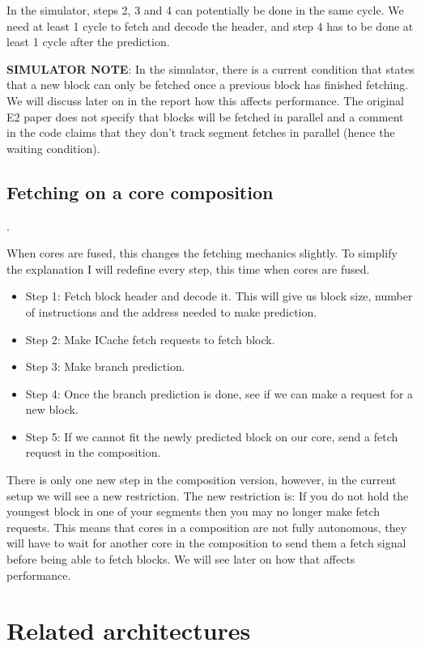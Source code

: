 In the simulator, steps 2, 3 and 4 can potentially be done in the same cycle. We need at least 1 cycle to fetch and decode the header, and step 4 has to be done at least 1 cycle after the prediction.

\textbf{SIMULATOR NOTE}: In the simulator, there is a current condition that states that a new block can only be fetched once a previous block has finished fetching. We will discuss later on in the report how this affects performance.
The original E2 paper does not specify that blocks will be fetched in parallel and a comment in the code claims that they don't track segment fetches in parallel (hence the waiting condition).

\subsection{Fetching on a core composition}.

When cores are fused, this changes the fetching mechanics slightly.
To simplify the explanation I will redefine every step, this time when cores are fused.


\begin{itemize}
\item Step 1: Fetch block header and decode it. This will give us block size, number of instructions and the address needed to make prediction.
\item Step 2: Make ICache fetch requests to fetch block.
\item Step 3: Make branch prediction.
\item Step 4: Once the branch prediction is done, see if we can make a request for a new block.
\item Step 5: If we cannot fit the newly predicted block on our core, send a fetch request in the composition.
\end{itemize}

There is only one new step in the composition version, however, in the current setup we will see a new restriction.
The new restriction is: If you do not hold the youngest block in one of your segments then you may no longer make fetch requests.
This means that cores in a composition are not fully autonomous, they will have to wait for another core in the composition to send them a fetch signal before being able to fetch blocks.
We will see later on how that affects performance.

\section{Related architectures}

